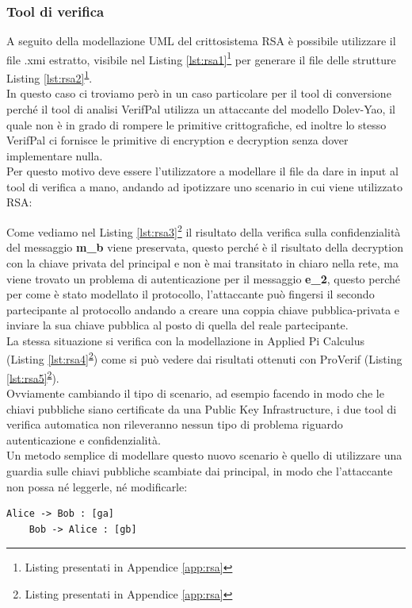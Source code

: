 \subsubsection*{Tool di verifica}
A seguito della modellazione UML del crittosistema RSA è possibile utilizzare il file .xmi estratto, visibile nel Listing \ref{lst:rsa1}\footnote{\label{note:c}Listing presentati in Appendice \ref{app:rsa}} per generare il file delle strutture Listing \ref{lst:rsa2}\textsuperscript{\ref{note:c}}.\\
In questo caso ci troviamo però in un caso particolare per il tool di conversione perch\'e il tool di analisi VerifPal utilizza un attaccante del modello Dolev-Yao, il quale non è in grado di rompere le primitive crittografiche, ed inoltre lo stesso VerifPal ci fornisce le primitive di encryption e decryption senza dover implementare nulla.\\
Per questo motivo deve essere l'utilizzatore a modellare il file da dare in input al tool di verifica a mano, andando ad ipotizzare uno scenario in cui viene utilizzato RSA:

Come vediamo nel Listing \ref{lst:rsa3}\footnote{\label{note:d}Listing presentati in Appendice \ref{app:rsa}} il risultato della verifica sulla confidenzialità del messaggio \textbf{m\_b} viene preservata, questo perch\'e è il risultato della decryption con la chiave privata del principal e non è mai transitato in chiaro nella rete, ma viene trovato un problema di autenticazione per il messaggio \textbf{e\_2}, questo perch\'e per come è stato modellato il protocollo, l'attaccante può fingersi il secondo partecipante al protocollo andando a creare una coppia chiave pubblica-privata e inviare la sua chiave pubblica al posto di quella del reale partecipante.\\
La stessa situazione si verifica con la modellazione in Applied Pi Calculus (Listing \ref{lst:rsa4}\textsuperscript{\ref{note:d}}) come si può vedere dai risultati ottenuti con ProVerif (Listing \ref{lst:rsa5}\textsuperscript{\ref{note:d}}).\\
Ovviamente cambiando il tipo di scenario, ad esempio facendo in modo che le chiavi pubbliche siano certificate da una Public Key Infrastructure, i due tool di verifica automatica non rileveranno nessun tipo di problema riguardo autenticazione e confidenzialità.\\
Un metodo semplice di modellare questo nuovo scenario è quello di utilizzare una guardia sulle chiavi pubbliche scambiate dai principal, in modo che l'attaccante non possa n\'e leggerle, n\'e modificarle: 
\begin{lstlisting}[language=vp,mathescape]
    Alice -> Bob : [ga]
    Bob -> Alice : [gb]
\end{lstlisting}
\newpage
